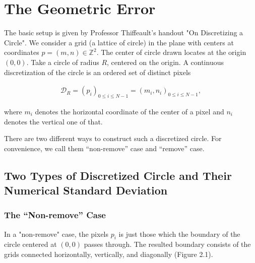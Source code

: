 \documentclass[letterpaper]{article}
\numberwithin{equation}{section} %
\numberwithin{figure}{section} %
\numberwithin{table}{section} %
\begin{document}
\section{The Geometric Error}

The basic setup is given by Professor Thiffeault's handout "On Discretizing a Circle". We consider a grid (a lattice of circle) in the plane with centers at coordinates $p=(m, n)\in\mathbb{Z}^2$. The center of circle drawn locates at the origin $(0,0)$. Take a circle of radius $R$, centered on the origin. A continuous discretization of the circle is an ordered set of distinct pixels 

\begin{align} 
\mathcal{D}_R=(p_{i})_{0 \leq i \leq N-1} = (m_i, n_i)_{0 \leq i \leq N-1},
\end{align}

\noindent
where $m_i$ denotes the horizontal coordinate of the center of a pixel and $n_i$ denotes the vertical one of that.

There are two different ways to construct such a discretized circle. For convenience, we call them \enquote{non-remove} case and \enquote{remove} case.


\subsection{Two Types of Discretized Circle and Their Numerical Standard Deviation}

\subsubsection{The \enquote{Non-remove} Case}


In a "non-remove" case, the pixels $p_i$ is just those which the boundary of the circle centered at $(0,0)$ passes through. The resulted boundary consists of the grids connected horizontally, vertically, and diagonally (Figure 2.1). 
\end{document}
